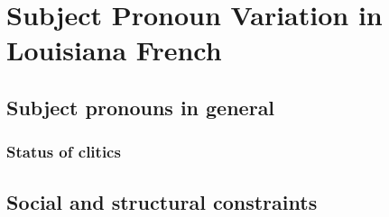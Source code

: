 \chapter{Subject Pronoun Variation in Louisiana French}
  \section{Subject pronouns in general}
    \subsection{Status of clitics}
  \section{Social and structural constraints}
